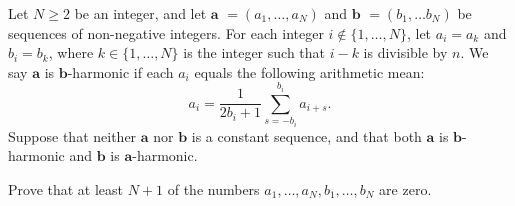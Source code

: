 Let $N \geq 2$ be an integer, and let $\mathbf a$ $= (a_1, \ldots, a_N)$ and $\mathbf b$ $= (b_1, \ldots b_N)$ be sequences of non-negative integers. For each integer $i \not \in \{1, \ldots, N\}$,  let $a_i = a_k$ and $b_i = b_k$,  where $k \in \{1, \ldots, N\}$ is the integer such that $i-k$ is divisible by $n$. We say $\mathbf a$ is $\mathbf b$-harmonic if each $a_i$ equals the following arithmetic mean: \[a_i = \frac{1}{2b_i+1} \sum_{s=-b_i}^{b_i} a_{i+s}.\]Suppose that neither $\mathbf a $ nor $\mathbf b$ is a constant sequence, and that both $\mathbf a$ is $\mathbf b$-harmonic and $\mathbf b$ is $\mathbf a$-harmonic.

Prove that at least $N+1$ of the numbers $a_1, \ldots, a_N,b_1, \ldots, b_N$ are zero.